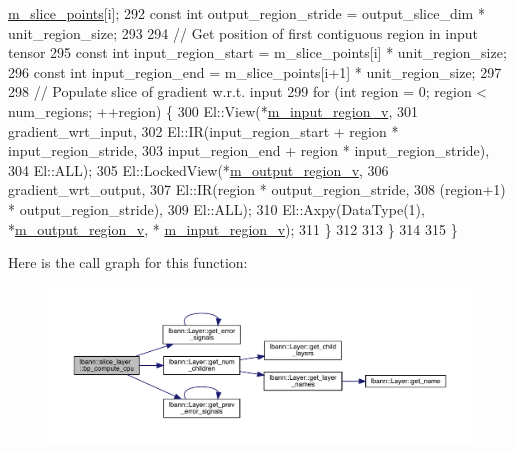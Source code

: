 \begin{DoxyCode}
      \hyperlink{classlbann_1_1slice__layer_af79dab13a70da2e81209e7ae15166e30}{m\_slice\_points}[i];
292       \textcolor{keyword}{const} \textcolor{keywordtype}{int} output\_region\_stride = output\_slice\_dim * unit\_region\_size;
293 
294       \textcolor{comment}{// Get position of first contiguous region in input tensor}
295       \textcolor{keyword}{const} \textcolor{keywordtype}{int} input\_region\_start = m\_slice\_points[i] * unit\_region\_size;
296       \textcolor{keyword}{const} \textcolor{keywordtype}{int} input\_region\_end = m\_slice\_points[i+1] * unit\_region\_size;
297 
298       \textcolor{comment}{// Populate slice of gradient w.r.t. input}
299       \textcolor{keywordflow}{for} (\textcolor{keywordtype}{int} region = 0; region < num\_regions; ++region) \{
300         El::View(*\hyperlink{classlbann_1_1slice__layer_a3e64f86a9e999d3d72867c6009aa99ba}{m\_input\_region\_v},
301                  gradient\_wrt\_input,
302                  El::IR(input\_region\_start + region * input\_region\_stride,
303                         input\_region\_end + region * input\_region\_stride),
304                  El::ALL);
305         El::LockedView(*\hyperlink{classlbann_1_1slice__layer_a9d72208fc8136641e91cb208c38f8b65}{m\_output\_region\_v},
306                        gradient\_wrt\_output,
307                        El::IR(region * output\_region\_stride,
308                               (region+1) * output\_region\_stride),
309                        El::ALL);
310         El::Axpy(DataType(1), *\hyperlink{classlbann_1_1slice__layer_a9d72208fc8136641e91cb208c38f8b65}{m\_output\_region\_v}, *
      \hyperlink{classlbann_1_1slice__layer_a3e64f86a9e999d3d72867c6009aa99ba}{m\_input\_region\_v});
311       \}
312 
313     \}
314 
315   \}
\end{DoxyCode}
Here is the call graph for this function\+:\nopagebreak
\begin{figure}[H]
\begin{center}
\leavevmode
\includegraphics[width=350pt]{classlbann_1_1slice__layer_af5d6887cac9a0c3afab8f361cdf81034_cgraph}
\end{center}
\end{figure}

